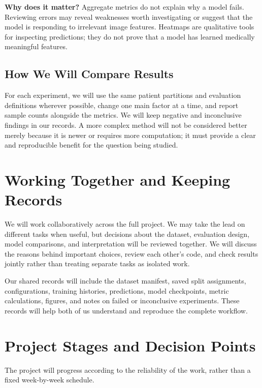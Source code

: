 \documentclass[11pt,a4paper]{article}
\begin{document}
\textbf{Why does it matter?} Aggregate metrics do not explain why a model fails. Reviewing errors may reveal weaknesses worth investigating or suggest that the model is responding to irrelevant image features. Heatmaps are qualitative tools for inspecting predictions; they do not prove that a model has learned medically meaningful features.

\subsection{How We Will Compare Results}

For each experiment, we will use the same patient partitions and evaluation definitions wherever possible, change one main factor at a time, and report sample counts alongside the metrics. We will keep negative and inconclusive findings in our records. A more complex method will not be considered better merely because it is newer or requires more computation; it must provide a clear and reproducible benefit for the question being studied.

\section{Working Together and Keeping Records}

We will work collaboratively across the full project. We may take the lead on different tasks when useful, but decisions about the dataset, evaluation design, model comparisons, and interpretation will be reviewed together. We will discuss the reasons behind important choices, review each other's code, and check results jointly rather than treating separate tasks as isolated work.

Our shared records will include the dataset manifest, saved split assignments, configurations, training histories, predictions, model checkpoints, metric calculations, figures, and notes on failed or inconclusive experiments. These records will help both of us understand and reproduce the complete workflow.

\section{Project Stages and Decision Points}

The project will progress according to the reliability of the work, rather than a fixed week-by-week schedule.
\end{document}
